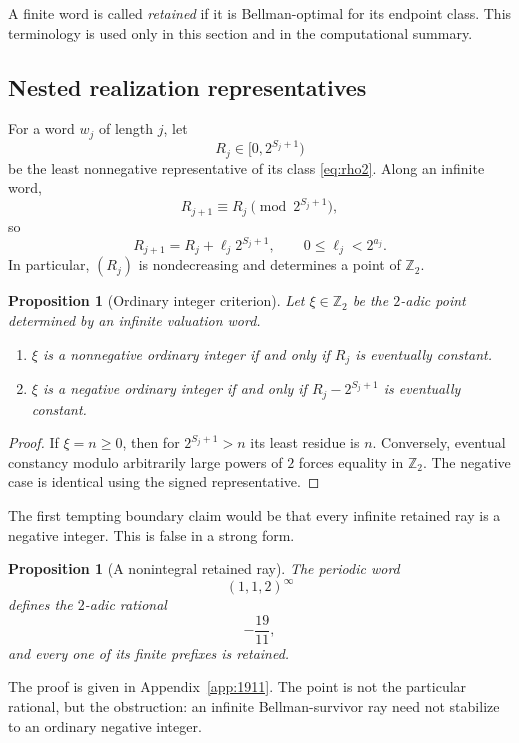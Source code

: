 \documentclass[11pt,reqno]{amsart}
\numberwithin{equation}{section}
\newtheorem{proposition}[theorem]{Proposition}
\theoremstyle{definition}
\theoremstyle{remark}
\newcommand{\Ztwo}{\mathbb Z_2}
\begin{document}
A finite word is called \emph{retained} if it is Bellman-optimal for its endpoint class.  This terminology is used only in this section and in the computational summary.

\subsection{Nested realization representatives}

For a word $w_j$ of length $j$, let
\[
 R_j\in[0,2^{S_j+1})
\]
be the least nonnegative representative of its class \eqref{eq:rho2}.  Along an infinite word,
\[
 R_{j+1}\equiv R_j\pmod{2^{S_j+1}},
\]
so
\begin{equation}\label{eq:Rnest}
 R_{j+1}=R_j+\ell_j2^{S_j+1},
 \qquad
 0\le\ell_j<2^{a_j}.
\end{equation}
In particular, $(R_j)$ is nondecreasing and determines a point of $\Ztwo$.

\begin{proposition}[Ordinary integer criterion]\label{prop:integercriterion}
Let $\xi\in\Ztwo$ be the $2$-adic point determined by an infinite valuation word.
\begin{enumerate}[label=\textup{(\alph*)}]
\item $\xi$ is a nonnegative ordinary integer if and only if $R_j$ is eventually constant.
\item $\xi$ is a negative ordinary integer if and only if $R_j-2^{S_j+1}$ is eventually constant.
\end{enumerate}
\end{proposition}

\begin{proof}
If $\xi=n\ge0$, then for $2^{S_j+1}>n$ its least residue is $n$.  Conversely, eventual constancy modulo arbitrarily large powers of $2$ forces equality in $\Ztwo$.  The negative case is identical using the signed representative.
\end{proof}

The first tempting boundary claim would be that every infinite retained ray is a negative integer.  This is false in a strong form.

\begin{proposition}[A nonintegral retained ray]\label{prop:1911}
The periodic word
\[
 (1,1,2)^{\infty}
\]
defines the $2$-adic rational
\[
 -\frac{19}{11},
\]
and every one of its finite prefixes is retained.
\end{proposition}

The proof is given in Appendix~\ref{app:1911}.  The point is not the particular rational, but the obstruction: an infinite Bellman-survivor ray need not stabilize to an ordinary negative integer.
\end{document}
